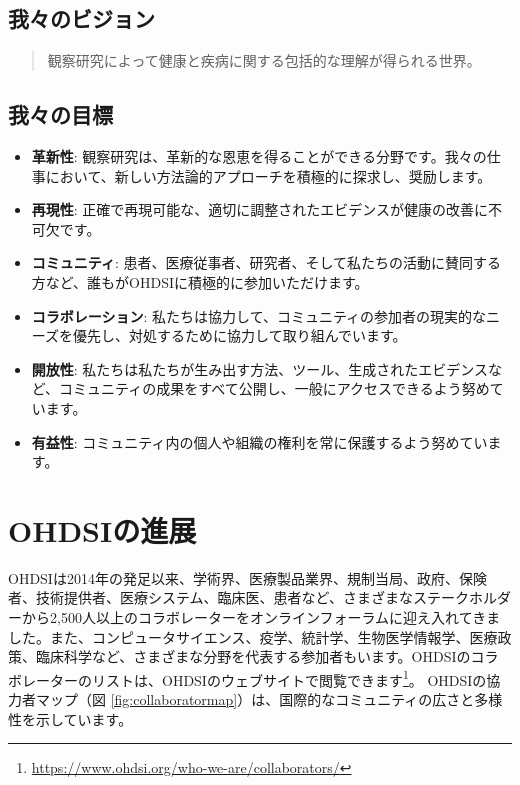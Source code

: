 \documentclass[
  11pt]{book}
\theoremstyle{definition}
\theoremstyle{definition}
\theoremstyle{definition}
\theoremstyle{definition}
\theoremstyle{remark}
\begin{document}
\subsection{我々のビジョン}\label{ux6211ux3005ux306eux30d3ux30b8ux30e7ux30f3}

\begin{quote}
観察研究によって健康と疾病に関する包括的な理解が得られる世界。 
\end{quote}

\subsection{我々の目標}\label{ux6211ux3005ux306eux76eeux6a19}

\begin{itemize}
\item
  \textbf{革新性}: 観察研究は、革新的な恩恵を得ることができる分野です。我々の仕事において、新しい方法論的アプローチを積極的に探求し、奨励します。
\item
  \textbf{再現性}: 正確で再現可能な、適切に調整されたエビデンスが健康の改善に不可欠です。
\item
  \textbf{コミュニティ}: 患者、医療従事者、研究者、そして私たちの活動に賛同する方など、誰もがOHDSIに積極的に参加いただけます。 
\item
  \textbf{コラボレーション}: 私たちは協力して、コミュニティの参加者の現実的なニーズを優先し、対処するために協力して取り組んでいます。
\item
  \textbf{開放性}: 私たちは私たちが生み出す方法、ツール、生成されたエビデンスなど、コミュニティの成果をすべて公開し、一般にアクセスできるよう努めています。
\item
  \textbf{有益性}: コミュニティ内の個人や組織の権利を常に保護するよう努めています。 
\end{itemize}

\section{OHDSIの進展}\label{ohdsiux306eux9032ux5c55}

OHDSIは2014年の発足以来、学術界、医療製品業界、規制当局、政府、保険者、技術提供者、医療システム、臨床医、患者など、さまざまなステークホルダーから2,500人以上のコラボレーターをオンラインフォーラムに迎え入れてきました。また、コンピュータサイエンス、疫学、統計学、生物医学情報学、医療政策、臨床科学など、さまざまな分野を代表する参加者もいます。OHDSIのコラボレーターのリストは、OHDSIのウェブサイトで閲覧できます\footnote{\url{https://www.ohdsi.org/who-we-are/collaborators/}}。 OHDSIの協力者マップ（図 \ref{fig:collaboratormap}）は、国際的なコミュニティの広さと多様性を示しています。
\end{document}
